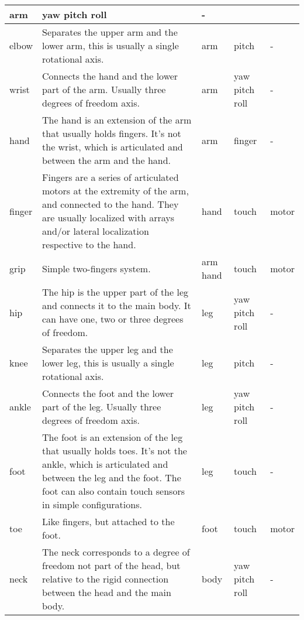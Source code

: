 \documentclass[a4paper]{article}
\begin{document}
\begin{center}
\begin{supertabular}{|m{2.312cm}|m{6.776cm}|m{2.629cm}|m{2.471cm}|m{2.1269999cm}|}
\ttfamily arm &
\ttfamily yaw pitch roll &
\ttfamily {}-\\\hline
elbow &
\sffamily Separates the upper arm and the lower
arm, this is usually a single rotational axis. &
\ttfamily arm &
\ttfamily pitch  &
\ttfamily {}-\\\hline
wrist &
\sffamily Connects the hand and the lower part
of the arm. Usually three degrees of freedom axis. &
\ttfamily arm &
\ttfamily yaw pitch roll &
\ttfamily {}-\\\hline
hand &
\sffamily The hand is an extension of the arm
that usually holds fingers. It’s not the wrist, which is articulated
and between the arm and the hand.  &
\ttfamily arm &
\ttfamily finger &
\ttfamily {}-\\\hline
finger &
\sffamily Fingers are a series of articulated
motors at the extremity of the arm, and connected to the hand. They are
usually localized with arrays and/or lateral localization respective to
the hand. &
\ttfamily hand &
\ttfamily touch &
\ttfamily motor\\\hline
grip &
\sffamily Simple two-fingers system. &
\ttfamily arm hand &
\ttfamily touch &
\ttfamily motor\\\hline
hip &
\sffamily The hip is the upper part of the leg
and connects it to the main body. It can have one, two or three degrees
of freedom. &
\ttfamily leg &
\ttfamily yaw pitch roll &
\ttfamily {}-\\\hline
knee &
\sffamily Separates the upper leg and the lower
leg, this is usually a single rotational axis. &
\ttfamily leg &
\ttfamily pitch &
\ttfamily {}-\\\hline
ankle &
\sffamily Connects the foot and the lower part
of the leg. Usually three degrees of freedom axis. &
\ttfamily leg &
\ttfamily yaw pitch roll &
\ttfamily {}-\\\hline
foot &
\sffamily The foot is an extension of the leg
that usually holds toes. It’s not the ankle, which is articulated and
between the leg and the foot. The foot can also contain touch sensors
in simple configurations. &
\ttfamily leg &
\ttfamily touch &
\ttfamily {}-\\\hline
toe &
\sffamily Like fingers, but attached to the
foot. &
\ttfamily foot &
\ttfamily touch &
\ttfamily motor\\\hline
neck  &
\sffamily The neck corresponds to a degree of
freedom not part of the head, but relative to the rigid connection
between the head and the main body.  &
\ttfamily body &
\ttfamily yaw pitch roll &
\ttfamily {}-\\\hline

\end{supertabular}
\end{center}
\end{document}
